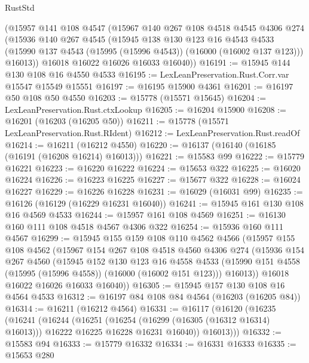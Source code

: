 \begin{lexlean}{RustStd}
\begin{coremodule}
{\begin{coremodule}
{{{{{{{{{{{{{{{{{{{{{{{{{{{{{{{{{{{{{{{{{{{{{{{{{{{{{{{{{{{{    (@15957
      @141
      @108
      @4547
      (@15967
        @140
        @267
        @108
        @4518
        @4545
        @4306
        @274
        (@15936
          @140
          @267
          @4545
          (@15945
            @138
            @130
            @123
            @16
            @4543
            @4533
            (@15990 @137 @4543 (@15995 (@15996 @4543)) (@16000 (@16002 @137 @123)))
            @16013))
        @16018
        @16022
        @16026
        @16033
        @16040))
@16191 := @15945 @144 @130 @108 @16 @4550 @4533
@16195 := LexLeanPreservation.Rust.Corr.var @15547 @15549 @15551
@16197 := @16195 @15900 @4361
@16201 := @16197 @50 @108 @50 @4550
@16203 := @15778 (@15571 @15645)
@16204 := LexLeanPreservation.Rust.ctxLookup
@16205 := @16204 @15900
@16208 := @16201 (@16203 (@16205 @50))
@16211 := @15778 (@15571 LexLeanPreservation.Rust.RIdent)
@16212 := LexLeanPreservation.Rust.readOf
@16214 := @16211 (@16212 @4550)
@16220 := @16137 (@16140 (@16185 (@16191 (@16208 @16214) @16013)))
@16221 := @15583 @99
@16222 := @15779 @16221
@16223 := @16220 @16222
@16224 := @15653 @322
@16225 := @16020 @16224
@16226 := @16223 @16225
@16227 := @15677 @322
@16228 := @16024 @16227
@16229 := @16226 @16228
@16231 := @16029 (@16031 @99)
@16235 := @16126 (@16129 (@16229 @16231 @16040))
@16241 := @15945 @161 @130 @108 @16 @4569 @4533
@16244 := @15957 @161 @108 @4569
@16251 := @16130 @160 @111 @108 @4518 @4567 @4306 @322
@16254 := @15936 @160 @111 @4567
@16299 := @15945
    @155
    @159
    @108
    @110
    @4562
    @4566
    (@15957
      @155
      @108
      @4562
      (@15967
        @154
        @267
        @108
        @4518
        @4560
        @4306
        @274
        (@15936
          @154
          @267
          @4560
          (@15945
            @152
            @130
            @123
            @16
            @4558
            @4533
            (@15990 @151 @4558 (@15995 (@15996 @4558)) (@16000 (@16002 @151 @123)))
            @16013))
        @16018
        @16022
        @16026
        @16033
        @16040))
@16305 := @15945 @157 @130 @108 @16 @4564 @4533
@16312 := @16197 @84 @108 @84 @4564 (@16203 (@16205 @84))
@16314 := @16211 (@16212 @4564)
@16331 := @16117
    (@16120
      (@16235
        (@16241
          (@16244
            (@16251
              (@16254 (@16299 (@16305 (@16312 @16314) @16013)))
              @16222
              @16225
              @16228
              @16231
              @16040))
          @16013)))
@16332 := @15583 @94
@16333 := @15779 @16332
@16334 := @16331 @16333
@16335 := @15653 @280
}}}}}}}}}}}}}}}}}}}}}}}}}}}}}}}}}}}}}}}}}}}}}}}}}}}}}}}}}}}}
\end{coremodule}}
\end{coremodule}
\end{lexlean}
